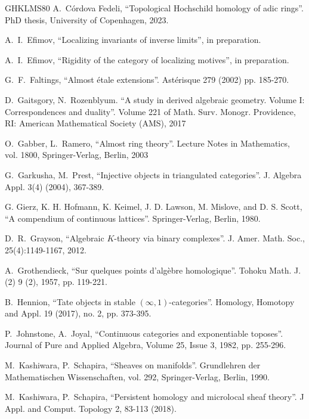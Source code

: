 \documentclass[11pt,leqno]{amsart}
\numberwithin{equation}{section}
\begin{document}
\begin{thebibliography}{GHKLMS80}
A.~C\'ordova Fedeli, ``Topological Hochschild homology of adic rings''. PhD thesis, University of Copenhagen, 2023.

A.~I.~Efimov, ``Localizing invariants of inverse limits'', in preparation.

A.~I.~Efimov, ``Rigidity of the category of localizing motives'', in preparation.


 G.~F.~Faltings, ``Almost étale extensions''. Ast\'erisque 279 (2002) pp. 185-270.

D.~Gaitsgory, N.~Rozenblyum. ``A study in derived algebraic geometry. Volume I: Correspondences and
duality''. Volume 221 of Math. Surv. Monogr. Providence, RI: American Mathematical Society (AMS), 2017

 O.~Gabber, L.~Ramero, ``Almost ring theory''. Lecture Notes in Mathematics, vol. 1800, Springer-Verlag, Berlin, 2003

 G.~Garkusha, M.~Prest, ``Injective objects in triangulated categories''. J. Algebra Appl. 3(4) (2004), 367-389.

 G. Gierz, K. H. Hofmann, K. Keimel, J. D. Lawson, M. Mislove, and D. S. Scott, ``A
compendium of continuous lattices''. Springer-Verlag, Berlin, 1980.

 D.~R.~Grayson, ``Algebraic $K$-theory via binary complexes''. J. Amer. Math. Soc.,
25(4):1149-1167, 2012.

 A.~Grothendieck, ``Sur quelques points d'alg\`ebre homologique''.
Tohoku Math. J. (2) 9 (2), 1957, pp. 119-221.

 B.~Hennion, ``Tate objects in stable $(\infty,1)$-categories''. Homology, Homotopy and Appl. 19 (2017), no. 2, pp. 373-395. 

P.~Johnstone, A.~Joyal,
``Continuous categories and exponentiable toposes''.
Journal of Pure and Applied Algebra,
Volume 25, Issue 3,
1982,
pp. 255-296.

M.~Kashiwara, P.~Schapira, ``Sheaves on manifolds''. Grundlehren der Mathematischen Wissenschaften, vol. 292, Springer-Verlag, Berlin, 1990.

M.~Kashiwara, P.~Schapira, ``Persistent homology and microlocal sheaf theory''. J Appl. and Comput. Topology 2, 83-113 (2018).


\end{thebibliography}
\end{document}
